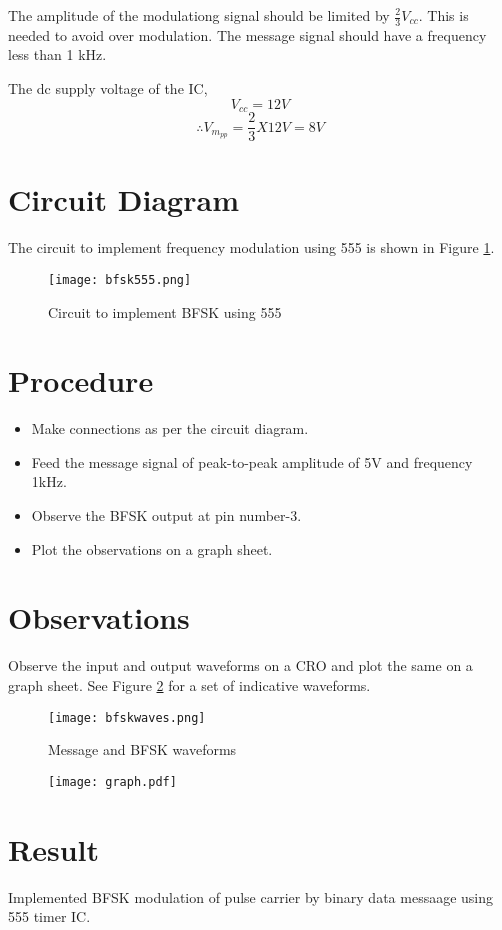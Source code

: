 The amplitude of the modulationg signal should be limited by $\frac{2}{3}V_{cc}$. This is needed to avoid over modulation. The message signal should have a frequency less than 1 kHz.

The dc supply voltage of the IC, 
\begin{equation}
V_{cc}=12 V
\end{equation}
\begin{equation}
\therefore V_{m_{pp}}=\frac{2}{3}X12 V=8V
\end{equation}
\section*{Circuit Diagram}
The circuit to implement frequency modulation using 555 is shown in Figure \ref{bfsk555ckt}.

\begin{figure}
\texttt{[image: bfsk555.png]}
\caption{Circuit to implement BFSK using 555}
\label{bfsk555ckt}
\end{figure}

\section*{Procedure}

\begin{itemize}
\item
Make connections as per the circuit diagram.

\item

Feed the message signal of peak-to-peak amplitude of 5V and frequency 1kHz.
\item Observe the BFSK output at pin number-3.

\item
Plot the observations on a graph sheet.
\end{itemize}


\section*{Observations}
Observe the input and output waveforms on a CRO and plot the same on a graph sheet. See Figure \ref{bfskwaves} for a set of indicative waveforms.


\begin{figure}
\begin{center}
\texttt{[image: bfskwaves.png]}
\caption{Message and BFSK waveforms}
\label{bfskwaves}
\end{center}


\end{figure}

\begin{figure}
	\texttt{[image: graph.pdf]}
\end{figure}

\section*{Result}
Implemented BFSK modulation of pulse carrier by binary data messaage using 555 timer IC.




